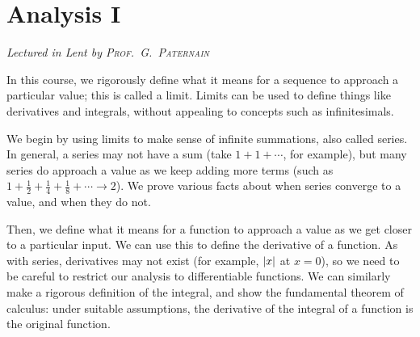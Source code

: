 \chapter[Analysis I \\ \textnormal{\emph{Lectured in Lent \oldstylenums{2021} by \textsc{Prof.\ G.\ Paternain}}}]{Analysis I}
\emph{\Large Lectured in Lent  by \textsc{Prof.\ G.\ Paternain}}

In this course, we rigorously define what it means for a sequence to approach a particular value; this is called a limit.
Limits can be used to define things like derivatives and integrals, without appealing to concepts such as infinitesimals.

We begin by using limits to make sense of infinite summations, also called series.
In general, a series may not have a sum (take \( 1 + 1 + \cdots \), for example), but many series do approach a value as we keep adding more terms (such as \( 1 + \frac{1}{2} + \frac{1}{4} + \frac{1}{8} + \cdots \to 2 \)).
We prove various facts about when series converge to a value, and when they do not.

Then, we define what it means for a function to approach a value as we get closer to a particular input.
We can use this to define the derivative of a function.
As with series, derivatives may not exist (for example, \( \abs{x} \) at \( x = 0 \)), so we need to be careful to restrict our analysis to differentiable functions.
We can similarly make a rigorous definition of the integral, and show the fundamental theorem of calculus: under suitable assumptions, the derivative of the integral of a function is the original function.


